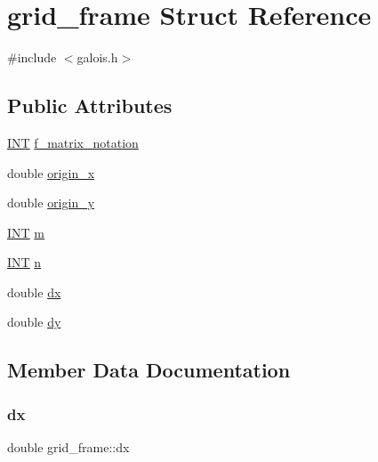 \hypertarget{structgrid__frame}{}\section{grid\+\_\+frame Struct Reference}
\label{structgrid__frame}


{\ttfamily \#include $<$galois.\+h$>$}

\subsection*{Public Attributes}
\begin{DoxyCompactItemize}
\item 
\mbox{\hyperlink{galois_8h_a09fddde158a3a20bd2dcadb609de11dc}{I\+NT}} \mbox{\hyperlink{structgrid__frame_a86cc4c5abe92495056f2160325b421d9}{f\+\_\+matrix\+\_\+notation}}
\item 
double \mbox{\hyperlink{structgrid__frame_ac8edbec88deeb08813d742a4a1a49ac3}{origin\+\_\+x}}
\item 
double \mbox{\hyperlink{structgrid__frame_a49a2bd792c58c6848fd86478758dfdad}{origin\+\_\+y}}
\item 
\mbox{\hyperlink{galois_8h_a09fddde158a3a20bd2dcadb609de11dc}{I\+NT}} \mbox{\hyperlink{structgrid__frame_afee980953ef280cc06471cb582510f8a}{m}}
\item 
\mbox{\hyperlink{galois_8h_a09fddde158a3a20bd2dcadb609de11dc}{I\+NT}} \mbox{\hyperlink{structgrid__frame_a54b10c4605ceb6063986abf58ee60f43}{n}}
\item 
double \mbox{\hyperlink{structgrid__frame_a3c89768ec3ba42946d148abed409c00d}{dx}}
\item 
double \mbox{\hyperlink{structgrid__frame_afa29e3bf76d306ff09f3e0411c65cdf3}{dy}}
\end{DoxyCompactItemize}


\subsection{Member Data Documentation}
\mbox{\label{structgrid__frame_a3c89768ec3ba42946d148abed409c00d}} 
\subsubsection{\texorpdfstring{dx}{dx}}
{\footnotesize\ttfamily double grid\+\_\+frame\+::dx}

